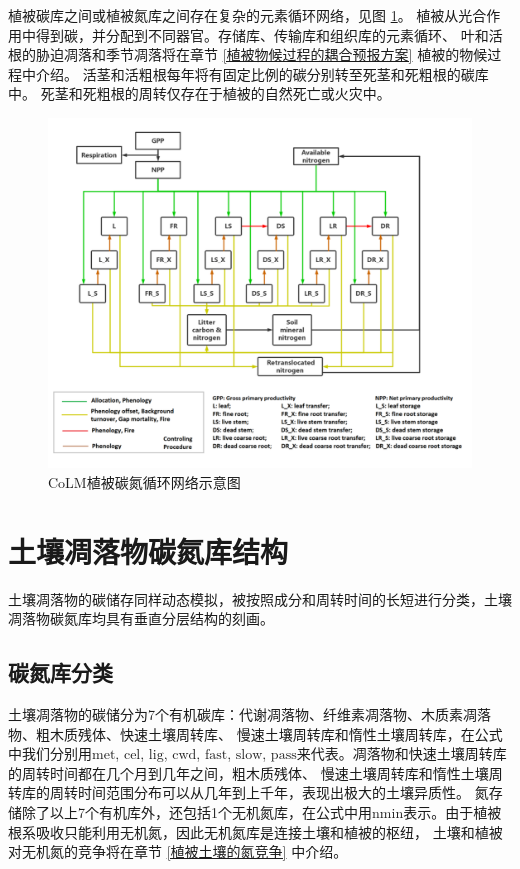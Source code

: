 植被碳库之间或植被氮库之间存在复杂的元素循环网络，见图 \ref{fig:CoLM植被碳氮循环网络示意图}。
植被从光合作用中得到碳，并分配到不同器官。存储库、传输库和组织库的元素循环、
叶和活根的胁迫凋落和季节凋落将在章节 \ref{植被物候过程的耦合预报方案} 植被的物候过程中介绍。
活茎和活粗根每年将有固定比例的碳分别转至死茎和死粗根的碳库中。
死茎和死粗根的周转仅存在于植被的自然死亡或火灾中。
{
  \begin{figure}[htbp]
    \centering
    \includegraphics{Figures/碳氮库结构/CoLM植被碳氮循环网络示意图.png}
    \caption[CoLM植被碳氮循环网络示意图]{CoLM植被碳氮循环网络示意图 \citep{lu2020full}}
    \label{fig:CoLM植被碳氮循环网络示意图}
  \end{figure}
}

\section{土壤凋落物碳氮库结构}\label{土壤凋落物碳氮库结构}
土壤凋落物的碳储存同样动态模拟，被按照成分和周转时间的长短进行分类，土壤凋落物碳氮库均具有垂直分层结构的刻画。
\subsection{碳氮库分类}\label{碳氮库分类}
土壤凋落物的碳储分为7个有机碳库：代谢凋落物、纤维素凋落物、木质素凋落物、粗木质残体、快速土壤周转库、
慢速土壤周转库和惰性土壤周转库，在公式中我们分别用${\mathrm {met}}$, ${\mathrm {cel}}$, ${\mathrm {lig}}$, ${\mathrm {cwd}}$, ${\mathrm {fast}}$, ${\mathrm {slow}}$, ${\mathrm {pass}}$来代表。凋落物和快速土壤周转库的周转时间都在几个月到几年之间，粗木质残体、
慢速土壤周转库和惰性土壤周转库的周转时间范围分布可以从几年到上千年，表现出极大的土壤异质性。
氮存储除了以上7个有机库外，还包括1个无机氮库，在公式中用${\mathrm {nmin}}$表示。由于植被根系吸收只能利用无机氮，因此无机氮库是连接土壤和植被的枢纽，
土壤和植被对无机氮的竞争将在章节 \ref{植被土壤的氮竞争} 中介绍。


